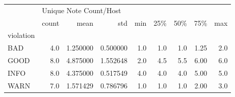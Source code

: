 \begin{tabular}{lrrrrrrrr}
\toprule
{} & \multicolumn{8}{l}{Unique Note Count/Host} \\
{} &                  count &      mean &       std &  min &  25\% &  50\% &   75\% &  max \\
violation &                        &           &           &      &      &      &       &      \\
\midrule
BAD       &                    4.0 &  1.250000 &  0.500000 &  1.0 &  1.0 &  1.0 &  1.25 &  2.0 \\
GOOD      &                    8.0 &  4.875000 &  1.552648 &  2.0 &  4.5 &  5.5 &  6.00 &  6.0 \\
INFO      &                    8.0 &  4.375000 &  0.517549 &  4.0 &  4.0 &  4.0 &  5.00 &  5.0 \\
WARN      &                    7.0 &  1.571429 &  0.786796 &  1.0 &  1.0 &  1.0 &  2.00 &  3.0 \\
\bottomrule
\end{tabular}
